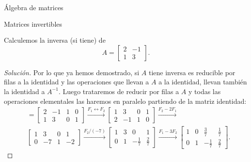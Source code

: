 \begin{chapter}{\'Algebra de matrices}
\begin{section}{Matrices invertibles}
            \begin{ejemplo*}
                Calculemos la inversa (si tiene) de 
                \begin{equation*}
                A=\begin{bmatrix}2&-1\\1&3 \end{bmatrix}.
                \end{equation*}
            \end{ejemplo*}
            \begin{proof}[Solución] Por lo que ya hemos demostrado, si $A$ tiene inversa es reducible por filas a la identidad y las operaciones que llevan a $A$ a la identidad, llevan también la identidad  a $A^{-1}$. Luego  trataremos de reducir por filas a $A$ y todas las operaciones elementales las haremos en paralelo partiendo de la matriz identidad:
                \begin{align*}
                [A|\Id] &= \left[\begin{array}{cc|cc}2&-1 &  1&0\\1&3& 0&1\end{array}\right] 
                \stackrel{F_1\leftrightarrow F_2}{\longrightarrow} 
                \left[\begin{array}{cc|cc}1&3& 0&1\\2&-1 &  1&0 \end{array}\right]
                \stackrel{F_2-2 F_1}{\longrightarrow}\\
                &\left[\begin{array}{cc|cc}1&3& 0&1\\0&-7 &  1&-2 \end{array}\right]
                \stackrel{F_2/(-7)}{\longrightarrow} 
                \left[\begin{array}{cc|cc}1&3& 0&1\\0&1 &  -\frac17&\frac27\end{array}\right]
                \stackrel{F_1-3 F_2}{\longrightarrow}
                \left[\begin{array}{cc|cc}1&0&  \frac37&\frac17\\0&1 &  -\frac17&\frac27 \end{array}\right].

\end{align*}
\end{proof}
\end{section}
\end{chapter}
